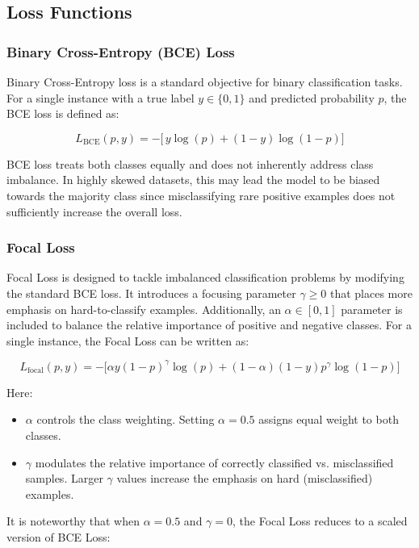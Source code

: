 \documentclass[11pt, oneside]{article}   	%
\begin{document}
\subsection{Loss Functions}

\subsubsection{Binary Cross-Entropy (BCE) Loss}

Binary Cross-Entropy loss is a standard objective for binary classification tasks. For a single instance with a true label \( y \in \{0,1\} \) and predicted probability \( p \), the BCE loss is defined as:

\[
L_{\text{BCE}}(p, y) = -\bigl[\,y \log(p) + (1 - y)\log(1 - p)\bigr]
\]

BCE loss treats both classes equally and does not inherently address class imbalance. In highly skewed datasets, this may lead the model to be biased towards the majority class since misclassifying rare positive examples does not sufficiently increase the overall loss.

\subsubsection{Focal Loss}

Focal Loss is designed to tackle imbalanced classification problems by modifying the standard BCE loss. It introduces a focusing parameter \(\gamma \geq 0\) that places more emphasis on hard-to-classify examples. Additionally, an \(\alpha \in [0,1]\) parameter is included to balance the relative importance of positive and negative classes. For a single instance, the Focal Loss can be written as:

\[
L_{\text{focal}}(p, y) = - \bigl[\alpha y(1 - p)^\gamma \log(p) + (1 - \alpha) (1 - y) p^\gamma \log(1 - p)\bigr]
\]

Here:
\begin{itemize}
    \item \(\alpha\) controls the class weighting. Setting \(\alpha = 0.5\) assigns equal weight to both classes.
    \item \(\gamma\) modulates the relative importance of correctly classified vs. misclassified samples. Larger \(\gamma\) values increase the emphasis on hard (misclassified) examples.
\end{itemize}

It is noteworthy that when \(\alpha = 0.5\) and \(\gamma = 0\), the Focal Loss reduces to a scaled version of BCE Loss:
\end{document}
